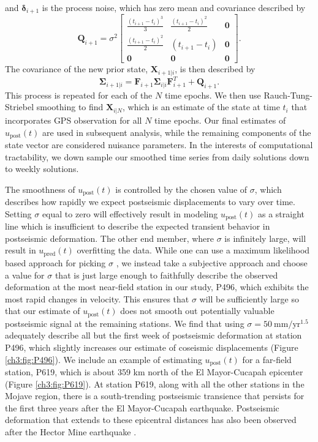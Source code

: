 and $\mathbf{\delta}_{i+1}$ is the process noise, which has zero mean
and covariance described by
\begin{equation}
  \mathbf{Q}_{i+1} = 
  \sigma^2 \left[
  \begin{array}{ccc}
  \frac{(t_{i+1} - t_i)^3}{3} & \frac{(t_{i+1} - t_{i})^2}{2} & \mathbf{0}\\
  \frac{(t_{i+1} - t_i)^2}{2} & (t_{i+1} - t_{i}) & \mathbf{0}\\ 
  \mathbf{0} & \mathbf{0} & \mathbf{0}
  \end{array}
  \right].
\end{equation}
The covariance of the new prior state, $\mathbf{X}_{i+1|i}$, is then
described by
\begin{equation}
  \mathbf{\Sigma}_{i+1|i} = \mathbf{F}_{i+1}\mathbf{\Sigma}_{i|i}\mathbf{F}^T_{i+1} + \mathbf{Q}_{i+1}.
\end{equation}
This process is repeated for each of the $N$ time epochs.  We then use
Rauch-Tung-Striebel smoothing \citep{Rauch1965} to find
$\mathbf{X}_{i|N}$, which is an estimate of the state at time $t_i$
that incorporates GPS observation for all $N$ time epochs.  Our final
estimates of $u_\mathrm{post}(t)$ are used in subsequent analysis,
while the remaining components of the state vector are considered
nuisance parameters. In the interests of computational tractability,
we down sample our smoothed time series from daily solutions down to
weekly solutions.

The smoothness of $u_\mathrm{post}(t)$ is controlled by the chosen
value of $\sigma$, which describes how rapidly we expect postseismic
displacements to vary over time.  Setting $\sigma$ equal to zero will
effectively result in modeling $u_\mathrm{post}(t)$ as a straight line
which is insufficient to describe the expected transient behavior in
postseismic deformation. The other end member, where $\sigma$ is
infinitely large, will result in $u_\mathrm{pred}(t)$ overfitting the
data. While one can use a maximum likelihood based approach for
picking $\sigma$ \citep[e.g.,][]{Segall1997}, we instead take a
subjective approach and choose a value for $\sigma$ that is just large
enough to faithfully describe the observed deformation at the most
near-field station in our study, P496, which exhibits the most rapid
changes in velocity. This ensures that $\sigma$ will be sufficiently
large so that our estimate of $u_\mathrm{post}(t)$ does not smooth out
potentially valuable postseismic signal at the remaining stations. We
find that using $\sigma = 50\ \mathrm{mm}/\mathrm{yr}^{1.5}$
adequately describe all but the first week of postseismic deformation
at station P496, which slightly increases our estimate of coseismic
displacements (Figure \ref{ch3:fig:P496}).  We include an example of
estimating $u_\mathrm{post}(t)$ for a far-field station, P619, which
is about 359 km north of the El Mayor-Cucapah epicenter (Figure
\ref{ch3:fig:P619}).  At station P619, along with all the other
stations in the Mojave region, there is a south-trending postseismic
transience that persists for the first three years after the El
Mayor-Cucapah earthquake.  Postseismic deformation that extends to
these epicentral distances has also been observed after the Hector
Mine earthquake \citep{Freed2007a}.

